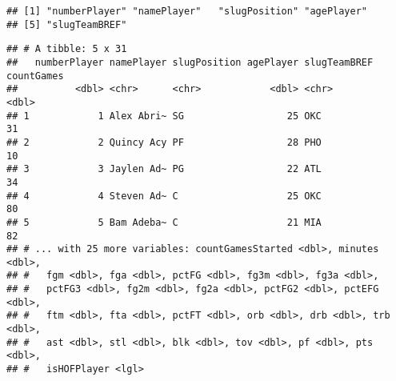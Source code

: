 \documentclass[]{article}
\newenvironment{Shaded}{\begin{snugshade}}{\end{snugshade}}
\newcommand{\KeywordTok}[1]{\textcolor[rgb]{0.13,0.29,0.53}{\textbf{#1}}}
\newcommand{\DataTypeTok}[1]{\textcolor[rgb]{0.13,0.29,0.53}{#1}}
\newcommand{\DecValTok}[1]{\textcolor[rgb]{0.00,0.00,0.81}{#1}}
\newcommand{\CharTok}[1]{\textcolor[rgb]{0.31,0.60,0.02}{#1}}
\newcommand{\StringTok}[1]{\textcolor[rgb]{0.31,0.60,0.02}{#1}}
\newcommand{\OperatorTok}[1]{\textcolor[rgb]{0.81,0.36,0.00}{\textbf{#1}}}
\newcommand{\NormalTok}[1]{#1}
\begin{document}
\begin{verbatim}
## [1] "numberPlayer" "namePlayer"   "slugPosition" "agePlayer"   
## [5] "slugTeamBREF"
\end{verbatim}

\begin{Shaded}
\end{Shaded}

\begin{verbatim}
## # A tibble: 5 x 31
##   numberPlayer namePlayer slugPosition agePlayer slugTeamBREF countGames
##          <dbl> <chr>      <chr>            <dbl> <chr>             <dbl>
## 1            1 Alex Abri~ SG                  25 OKC                  31
## 2            2 Quincy Acy PF                  28 PHO                  10
## 3            3 Jaylen Ad~ PG                  22 ATL                  34
## 4            4 Steven Ad~ C                   25 OKC                  80
## 5            5 Bam Adeba~ C                   21 MIA                  82
## # ... with 25 more variables: countGamesStarted <dbl>, minutes <dbl>,
## #   fgm <dbl>, fga <dbl>, pctFG <dbl>, fg3m <dbl>, fg3a <dbl>,
## #   pctFG3 <dbl>, fg2m <dbl>, fg2a <dbl>, pctFG2 <dbl>, pctEFG <dbl>,
## #   ftm <dbl>, fta <dbl>, pctFT <dbl>, orb <dbl>, drb <dbl>, trb <dbl>,
## #   ast <dbl>, stl <dbl>, blk <dbl>, tov <dbl>, pf <dbl>, pts <dbl>,
## #   isHOFPlayer <lgl>
\end{verbatim}
\end{document}
